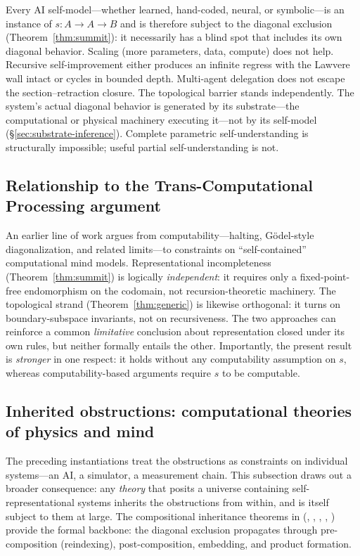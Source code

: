\documentclass[11pt]{article}
\begin{document}
\begin{keybox}[title={Implications for AI and AGI}]
Every AI self-model---whether learned, hand-coded, neural, or
symbolic---is an instance of $s : A \to A \to B$ and is therefore
subject to the diagonal exclusion (Theorem~\ref{thm:summit}): it
necessarily has a blind spot that includes its own diagonal behavior.
Scaling (more parameters, data, compute) does not help.  Recursive
self-improvement either produces an infinite regress with the Lawvere
wall intact or cycles in bounded depth.  Multi-agent delegation does
not escape the section--retraction closure.  The topological barrier
stands independently.  The system's actual diagonal behavior is
generated by its substrate---the computational or physical machinery
executing it---not by its self-model
(\S\ref{sec:substrate-inference}).
Complete parametric self-understanding is structurally impossible;
useful partial self-understanding is not.
\end{keybox}

\subsection{Relationship to the Trans-Computational Processing argument}

An earlier line of work argues from computability---halting,
G\"odel-style diagonalization, and related limits---to constraints on
``self-contained'' computational mind models.  Representational
incompleteness (Theorem~\ref{thm:summit}) is logically
\emph{independent}: it requires only a fixed-point-free endomorphism
on the codomain, not recursion-theoretic machinery.  The topological
strand (Theorem~\ref{thm:generic}) is likewise orthogonal: it turns on
boundary-subspace invariants, not on recursiveness.  The two approaches
can reinforce a common \emph{limitative} conclusion about
representation closed under its own rules, but neither formally entails
the other.  Importantly, the present result is \emph{stronger} in one
respect: it holds without any computability assumption on $s$, whereas
computability-based arguments require $s$ to be computable.

\subsection{Inherited obstructions: computational theories of physics and mind}
\label{sec:inherited}

The preceding instantiations treat the obstructions as constraints on
individual systems---an AI, a simulator, a measurement chain.  This
subsection draws out a broader consequence: any \emph{theory} that
posits a universe containing self-representational systems inherits
the obstructions from within, and is itself subject to them at large.
The compositional inheritance theorems in 
(,
,
,
,
)
provide the formal backbone: the diagonal exclusion propagates through
pre-composition (reindexing), post-composition, embedding, and product
formation.
\end{document}
